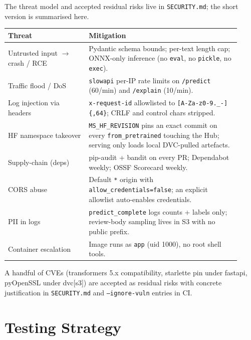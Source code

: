 \documentclass[11pt,a4paper]{article}
\begin{document}
The threat model and accepted residual risks live in \texttt{SECURITY.md}; the
short version is summarised here.

\begin{longtable}{@{}p{0.32\linewidth}p{0.6\linewidth}@{}}
\toprule
\textbf{Threat} & \textbf{Mitigation} \\ \midrule \endhead
Untrusted input $\to$ crash / RCE & Pydantic schema bounds; per-text length cap;
                                    ONNX-only inference (no \texttt{eval}, no
                                    \texttt{pickle}, no \texttt{exec}). \\
Traffic flood / DoS  & \texttt{slowapi} per-IP rate limits on \texttt{/predict}
                       (60/min) and \texttt{/explain} (10/min). \\
Log injection via headers & \texttt{x-request-id} allowlisted to
                            \texttt{[A-Za-z0-9.\_-]\{,64\}}; CRLF and control
                            chars stripped. \\
HF namespace takeover & \texttt{MS\_HF\_REVISION} pins an exact commit on every
                        \texttt{from\_pretrained} touching the Hub; serving only
                        loads local DVC-pulled artefacts. \\
Supply-chain (deps) & pip-audit + bandit on every PR; Dependabot weekly;
                      OSSF Scorecard weekly. \\
CORS abuse & Default \texttt{*} origin with \texttt{allow\_credentials=false}; an
             explicit allowlist auto-enables credentials. \\
PII in logs & \texttt{predict\_complete} logs counts + labels only;
              review-body sampling lives in S3 with no public prefix. \\
Container escalation & Image runs as \texttt{app} (uid 1000), no root shell tools. \\
\bottomrule
\end{longtable}

\noindent A handful of CVEs (transformers 5.x compatibility, starlette pin under
fastapi, pyOpenSSL under dvc[s3]) are accepted as residual risks with concrete
justification in \texttt{SECURITY.md} and \texttt{--ignore-vuln} entries in CI.

\section{Testing Strategy}
\end{document}
